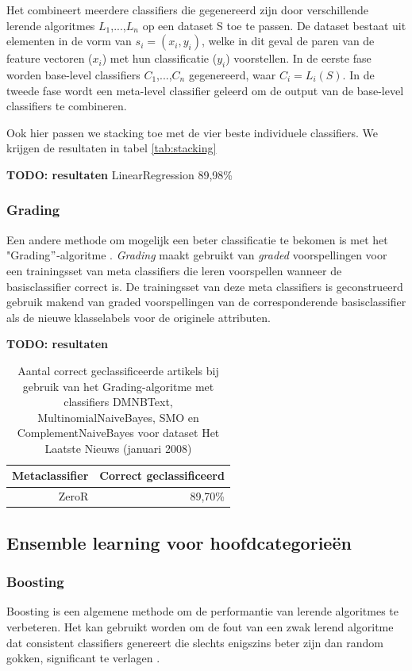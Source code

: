 Het combineert meerdere classifiers die gegenereerd zijn door verschillende lerende algoritmes $L_1$,...,$L_n$ op een dataset S toe te passen. De dataset bestaat uit elementen in de vorm van $s_i = (x_i, y_i)$, welke in dit geval de paren van de feature vectoren ($x_i$) met hun classificatie ($y_i$) voorstellen. In de eerste fase worden base-level classifiers $C_1$,...,$C_n$ gegenereerd, waar $C_i = L_{i}(S)$. In de tweede fase wordt een meta-level classifier geleerd om de output van de base-level classifiers te combineren.

Ook hier passen we stacking toe met de vier beste individuele classifiers. We krijgen de resultaten in tabel \ref{tab:stacking}

\textbf{TODO: resultaten}
LinearRegression 89,98\%

\subsubsection{Grading}\label{grading}
Een andere methode om mogelijk een beter classificatie te bekomen is met het "Grading$"$-algoritme \cite{SEEWALD}. \textit{Grading} maakt gebruikt van \textit{graded} voorspellingen voor een trainingsset van meta classifiers die leren voorspellen wanneer de basisclassifier correct is. De trainingsset van deze meta classifiers is geconstrueerd gebruik makend van graded voorspellingen van de corresponderende basisclassifier als de nieuwe klasselabels voor de originele attributen. 

\textbf{TODO: resultaten}
\begin{table}[htbp]
	\centering
	\caption{Aantal correct geclassificeerde artikels bij gebruik van het Grading-algoritme met classifiers DMNBText, MultinomialNaiveBayes, SMO en ComplementNaiveBayes voor dataset Het Laatste Nieuws (januari 2008)}
	\begin{tabular}{rr}
		\toprule
		Metaclassifier & Correct geclassificeerd \\
		\midrule
		ZeroR & 89,70\% \\
		\bottomrule
	\end{tabular}%
	\label{tab:grading}%
\end{table}%

\subsection{Ensemble learning voor hoofdcategorie\"en}
\subsubsection{Boosting}\label{boosting}
Boosting is een algemene methode om de performantie van lerende algoritmes te verbeteren. Het kan gebruikt worden om de fout van een zwak lerend algoritme dat consistent classifiers genereert die slechts enigszins beter zijn dan random gokken, significant te verlagen \cite{Freund1996}.


